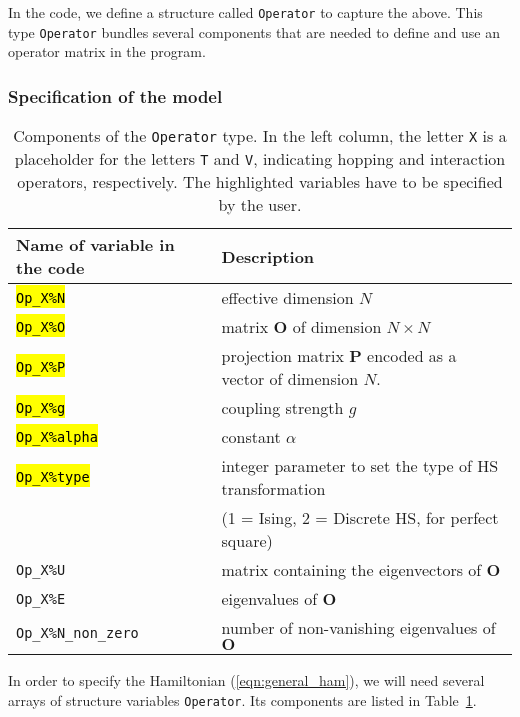 In the code, we define a structure called \texttt{Operator} to capture the above. 
This type \texttt{Operator} bundles several components that are needed to define and use an operator matrix in the program.  

\subsubsection{Specification of the model}\label{sec:specific}
%
\begin{table}[h]
   \begin{tabular}{l l}
    Name of variable in the code & Description \\\hline
    \hl{\texttt{Op\_X\%N}}            &  effective dimension $N$ \\
    \hl{\texttt{Op\_X\%O}}            &  matrix  $\mathbf{O}$  of dimension $N \times N$\\
    \hl{\texttt{Op\_X\%P}}            &  projection matrix $\mathbf{P}$  encoded as a vector of dimension $N$.\\
    \hl{\texttt{Op\_X\%g}}            &  coupling strength $g$ \\  
    \hl{\texttt{Op\_X\%alpha}}      &  constant $\alpha$ \\
    \hl{\texttt{Op\_X\%type}}        &  integer parameter to set the type of 
                                             HS transformation\\
                                &  (1 = Ising, 2 = Discrete HS, for perfect square)  \\ 
    \texttt{Op\_X\%U}            &  matrix containing the eigenvectors of $\mathbf{O}$  \\
    \texttt{Op\_X\%E}            &  eigenvalues of $\mathbf{O}$ \\
    \texttt{Op\_X\%N\_non\_zero} &  number of non-vanishing eigenvalues of $\mathbf{O}$ 
   \end{tabular}
   \caption{Components of the \texttt{Operator}  type. 
   In the left column, the letter \texttt{X} is a placeholder for the letters \texttt{T} and \texttt{V}, 
   indicating hopping and interaction operators, respectively.
   The highlighted variables have to be specified by the user.
    \label{table:operator}}
\end{table}
%
In order to specify the  Hamiltonian (\ref{eqn:general_ham}), we will  need several arrays of  structure variables \texttt{Operator}. Its components are listed in Table~\ref{table:operator}.  
